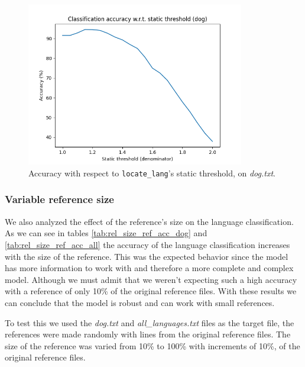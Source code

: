 \documentclass{article}
\begin{document}
\begin{figure}
    \centering
    \includegraphics[width=0.85\textwidth]{../results/dog/ll-s.png}
    \caption{Accuracy with respect to \texttt{locate\_lang}'s static threshold, on \textit{dog.txt}.}
    \label{fig:ll_s_dog}
\end{figure}

\subsubsection{Variable reference size}
\label{subsubsec:results_locate_lang_variable_reference_size}

We also analyzed the effect of the reference's size on the language classification.
As we can see in tables \ref{tab:rel_size_ref_acc_dog} and \ref{tab:rel_size_ref_acc_all} the accuracy of the language classification increases with the size of the reference.
This was the expected behavior since the model has more information to work with and therefore a more complete and complex model.
Although we must admit that we weren't expecting such a high accuracy with a reference of only 10\% of the original reference files.
With these results we can conclude that the model is robust and can work with small references.

To test this we used the \textit{dog.txt} and \textit{all\_languages.txt} files as the target file, the references were made randomly with lines from the original 
reference files. The size of the reference was varied from 10\% to 100\% with increments of 10\%, of the original reference files.
\end{document}
